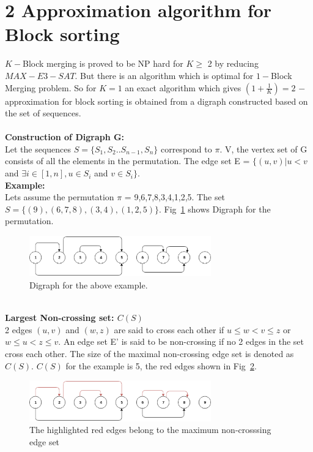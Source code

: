 \documentclass[BTech]{iitmdiss}
\begin{document}
\section{2 Approximation algorithm for Block sorting}
$K-$Block merging is proved to be NP hard for $K \geq$ 2 by reducing $MAX-E3-SAT$. But there is an algorithm which is optimal for $1-$Block Merging problem. So for $K = 1$ an exact algorithm which gives $(1+\frac{1}{K}) = 2$ $-$ approximation for block sorting is obtained from a digraph constructed based on the set of sequences.\\~\\
\noindent
\textbf{Construction of Digraph G:}\\
Let the sequences $S = \{S_1,S_2 .. S_{n-1},S_n\}$ correspond to $\pi$. V, the vertex set of G consists of all the elements in the permutation. The edge set E  = $\{(u,v)| u<v$ and $\exists i\in [1,n], u \in S_i$ and $v \in S_i \}$.\\
\textbf{Example:}\\
Lets assume the permutation $\pi$ = 9,6,7,8,3,4,1,2,5. The set $S = \{(9),(6,7,8),(3,4),(1,2,5)\}$. Fig~\ref{fig:digraph} shows Digraph for the permutation. 
\begin{figure}[htpb]
  \begin{center}
  \includegraphics[width=0.7\textwidth]{digraph1.eps}
    \caption {Digraph for the above example.}
  \label{fig:digraph}
  \end{center}
\end{figure}
\\
\noindent
\textbf{Largest Non-crossing set: $C(S)$}\\
2 edges $(u,v)$ and $(w,z)$ are said to cross each other if $u\leq w < v \leq z$ or $w\leq u < z \leq v$. An edge set E' is said to be non-crossing if no 2 edges in the set cross each other. The size of the maximal non-crossing edge set is denoted as $C(S).$ $C(S)$ for the example is 5, the red edges shown in Fig~\ref{fig:digraphred}.
\begin{figure}[htpb]
  \begin{center}
  \includegraphics[width=0.7\textwidth]{digraph2.eps}
    \caption {The highlighted red edges belong to the maximum non-crosssing edge set}
  \label{fig:digraphred}
  \end{center}
\end{figure}
\end{document}
